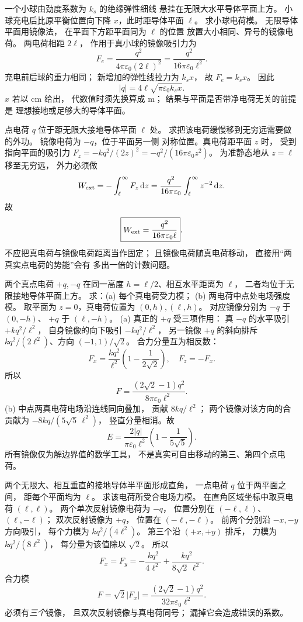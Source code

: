 一个小球由劲度系数为 $k_s$ 的绝缘弹性细线
悬挂在无限大水平导体平面上方。
小球充电后比原平衡位置向下降
$x$，此时距导体平面 $\ell$。
求小球电荷模。
\exsolution
无限导体平面用镜像法，
在平面下方距平面同为 $\ell$ 的位置
放置大小相同、异号的镜像电荷。
两电荷相距 $2\ell$，
作用于真小球的镜像吸引力为
\[
F_e=\frac{q^2}{4\pi\varepsilon_0(2\ell)^2}
=\frac{q^2}{16\pi\varepsilon_0\ell^2}.
\]
充电前后球的重力相同；
新增加的弹性线拉力为 $k_sx$，
故 $F_e=k_sx$。
因此
\[
\boxed{|q|=4\ell\sqrt{\pi\varepsilon_0k_sx}}.
\]
\excheck $x$ 若以 cm 给出，
代数值时须先换算成 m；
结果与平面是否带净电荷无关的前提是
理想接地或足够大的导体平面。

点电荷 $q$ 位于距无限大接地导体平面
$\ell$ 处。
求把该电荷缓慢移到无穷远需要做的外功。
\exsolution
镜像电荷为 $-q$，位于平面另一侧
对称位置。真电荷距平面 $z$ 时，
受到指向平面的吸引力
$F_z=-kq^2/(2z)^2=-q^2/(16\pi\varepsilon_0z^2)$。
为准静态地从 $z=\ell$ 移至无穷远，
外力必须做
\[
W_{\rm ext}=-\int_\ell^\infty F_z\,\mathrm dz
=\frac{q^2}{16\pi\varepsilon_0}
\int_\ell^\infty z^{-2}\,\mathrm dz.
\]
故
\[
\boxed{W_{\rm ext}=\frac{q^2}{16\pi\varepsilon_0\ell}}.
\]
\excheck 不应把真电荷与镜像电荷距离当作固定；
且镜像电荷随真电荷移动，
直接用“两真实点电荷的势能”会有
多出一倍的计数问题。

两个真点电荷 $+q,-q$ 在同一高度
$h=\ell/2$、相互水平距离为 $\ell$，
二者均位于无限接地导体平面上方。
求：(a) 每个真电荷受力模；
(b) 两电荷中点处电场强度模。
\exsolution
取平面为 $z=0$，真电荷位置为
$(0,h),(\ell,h)$。
对应镜像分别为 $-q$ 于 $(0,-h)$、
$+q$ 于 $(\ell,-h)$。
(a) 真正的 $+q$ 受三项作用：
真 $-q$ 的水平吸引
$+kq^2/\ell^2$，
自身镜像的向下吸引
$-kq^2/\ell^2$，
另一镜像 $+q$ 的斜向排斥
$kq^2/(2\ell^2)$、方向 $(-1,1)/\sqrt2$。
合力分量互为相反数：
\[
F_x=\frac{kq^2}{\ell^2}
\left(1-\frac{1}{2\sqrt2}\right),\quad F_z=-F_x.
\]
所以
\[
\boxed{F=\frac{(2\sqrt2-1)q^2}
{8\pi\varepsilon_0\ell^2}}.
\]
(b) 中点两真电荷电场沿连线同向叠加，
贡献 $8kq/\ell^2$；
两个镜像对该方向的合贡献为
$-8kq/(5\sqrt5\,\ell^2)$，
竖直分量相消。故
\[
\boxed{E=
\frac{2|q|}{\pi\varepsilon_0\ell^2}
\left(1-\frac1{5\sqrt5}\right)}.
\]
\excheck 所有镜像仅为解边界值的数学工具，
不是真实可自由移动的第三、第四个点电荷。

两个无限大、相互垂直的接地导体半平面形成直角，
一点电荷 $q$ 位于两平面之间，
距每个平面均为 $\ell$。
求该电荷所受合电场力模。
\exsolution
在直角区域坐标中取真电荷 $(\ell,\ell)$。
两个单次反射镜像电荷为 $-q$，
位置分别在 $(-\ell,\ell)$、
$(\ell,-\ell)$；
双次反射镜像为 $+q$，
位置在 $(-\ell,-\ell)$。
前两个分别沿 $-x,-y$ 方向吸引，
每个力模为 $kq^2/(4\ell^2)$。
第三个沿 $(+x,+y)$ 排斥，
力模为 $kq^2/(8\ell^2)$，
每分量为该值除以 $\sqrt2$。
所以
\[
F_x=F_y=
-\frac{kq^2}{4\ell^2}
+\frac{kq^2}{8\sqrt2\,\ell^2}.
\]
合力模
\[
\boxed{F=
\sqrt2|F_x|=
\frac{(2\sqrt2-1)q^2}
{32\pi\varepsilon_0\ell^2}}.
\]
\excheck 必须有\emph{三个}镜像，
且双次反射镜像与真电荷同号；
漏掉它会造成错误的系数。

